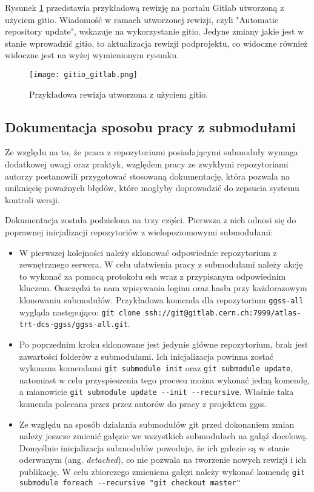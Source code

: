 Rysunek \ref{fig:gitlab_gitio} przedstawia przykładową rewizję na portalu Gitlab utworzoną z użyciem gitio. Wiadomość w ramach utworzonej rewizji, czyli "Automatic repository update", wskazuje na wykorzystanie gitio. Jedyne zmiany jakie jest w stanie wprowadzić gitio, to aktualizacja rewizji podprojektu, co widoczne również widoczne jest na wyżej wymienionym rysunku.

\begin{figure}[H]
    \centering
    \texttt{[image: gitio\_gitlab.png]}
    \caption{Przykładowa rewizja utworzona z użyciem gitio.}
    \label{fig:gitlab_gitio}
\end{figure}


\subsection{Dokumentacja sposobu pracy z submodułami}

Ze względu na to, że praca z repozytoriami posiadającymi submoduły wymaga dodatkowej uwagi oraz praktyk, względem pracy ze zwykłymi repozytoriami autorzy postanowili przygotować stosowaną dokumentację, która pozwala na uniknięcię poważnych błędów, które mogłyby doprowadzić do zepsucia systemu kontroli wersji.

Dokumentacja została podzielona na trzy części. Pierwsza z nich odnosi się do poprawnej inicjalizacji repozytoriów z wielopoziomowymi submodułami:
\begin{itemize}
    \item W pierwszej kolejności należy sklonować odpowiednie repozytorium z zewnętrznego serwera. W celu ułatwienia pracy z submodułami należy akcję to wykonać za pomocą protokołu ssh wraz z przypisanym odpowiednim kluczem. Oszczędzi to nam wpisywania loginu oraz hasła przy każdorazowym klonowaniu submodułów. Przykładowa komenda dla repozytorium \lstinline{ggss-all} wygląda następująco: \lstinline{git clone ssh://git@gitlab.cern.ch:7999/atlas-trt-dcs-ggss/ggss-all.git}.
    \item Po poprzednim kroku sklonowane jest jedynie główne repozytorium, brak jest zawartości folderów z submodułami. Ich inicjalizacja powinna zostać wykonana komendami \lstinline{git submodule init} oraz \lstinline{git submodule update}, natomiast w celu przyspieszenia tego procesu można wykonać jedną komendę, a mianowicie \lstinline{git submodule update --init --recursive}. Właśnie taka komenda polecana przez przez autorów do pracy z projektem ggss.
    \item Ze względu na sposób działania submodułów git przed dokonaniem zmian należy jeszcze zmienić gałęzie we wszystkich submodułach na gałąź docelową. Domyślnie inicjalizacja submodułów powoduje, że ich gałezie są w stanie oderwanym (ang. \emph{detached}), co nie pozwala na tworzenie nowych rewizji i ich publikację. W celu zbiorczego zmieniena gałęzi należy wykonać komendę \lstinline{git submodule foreach --recursive "git checkout master"}
\end{itemize}

